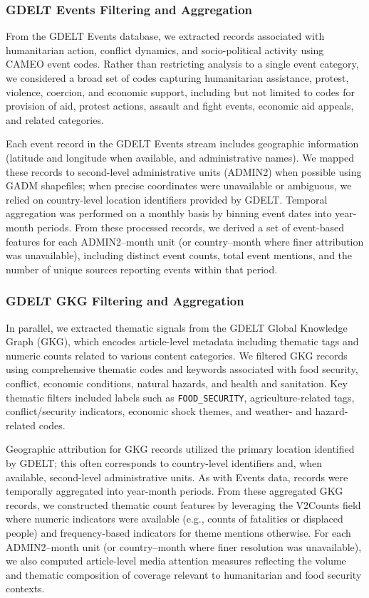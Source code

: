 \documentclass{article}
\begin{document}
\subsubsection{GDELT Events Filtering and Aggregation}

From the GDELT Events database, we extracted records associated with humanitarian action, conflict dynamics, and socio-political activity using CAMEO event codes. Rather than restricting analysis to a single event category, we considered a broad set of codes capturing humanitarian assistance, protest, violence, coercion, and economic support, including but not limited to codes for provision of aid, protest actions, assault and fight events, economic aid appeals, and related categories.

Each event record in the GDELT Events stream includes geographic information (latitude and longitude when available, and administrative names). We mapped these records to second-level administrative units (ADMIN2) when possible using GADM shapefiles; when precise coordinates were unavailable or ambiguous, we relied on country-level location identifiers provided by GDELT. Temporal aggregation was performed on a monthly basis by binning event dates into year-month periods. From these processed records, we derived a set of event-based features for each ADMIN2–month unit (or country–month where finer attribution was unavailable), including distinct event counts, total event mentions, and the number of unique sources reporting events within that period.

\subsubsection{GDELT GKG Filtering and Aggregation}

In parallel, we extracted thematic signals from the GDELT Global Knowledge Graph (GKG), which encodes article-level metadata including thematic tags and numeric counts related to various content categories. We filtered GKG records using comprehensive thematic codes and keywords associated with food security, conflict, economic conditions, natural hazards, and health and sanitation. Key thematic filters included labels such as \texttt{FOOD\_SECURITY}, agriculture-related tags, conflict/security indicators, economic shock themes, and weather- and hazard-related codes.

Geographic attribution for GKG records utilized the primary location identified by GDELT; this often corresponds to country-level identifiers and, when available, second-level administrative units. As with Events data, records were temporally aggregated into year-month periods. From these aggregated GKG records, we constructed thematic count features by leveraging the V2Counts field where numeric indicators were available (e.g., counts of fatalities or displaced people) and frequency-based indicators for theme mentions otherwise. For each ADMIN2–month unit (or country–month where finer resolution was unavailable), we also computed article-level media attention measures reflecting the volume and thematic composition of coverage relevant to humanitarian and food security contexts.
\end{document}
